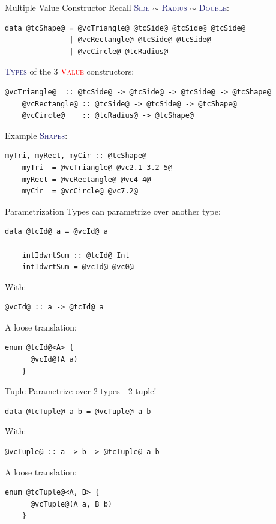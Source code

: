 \documentclass[xcolor={usenames,dvipsnames}]{beamer}
\newcommand{\htycon}[1]{\textcolor{MidnightBlue}{\textsc{#1}}}
\newcommand{\hvalcon}[1]{\textcolor{Red}{\textsc{#1}}}
\begin{document}
\begin{frame}[fragile]{Multiple Value Constructor}
  Recall \htycon{Side} $\sim$ \htycon{Radius} $\sim$ \htycon{Double}:
  \begin{lstlisting}[style=hask]
    data @tcShape@ = @vcTriangle@ @tcSide@ @tcSide@ @tcSide@
               | @vcRectangle@ @tcSide@ @tcSide@
               | @vcCircle@ @tcRadius@
  \end{lstlisting}

  \htycon{Types} of the 3 \hvalcon{Value} constructors:
  \begin{lstlisting}[style=hask]
    @vcTriangle@  :: @tcSide@ -> @tcSide@ -> @tcSide@ -> @tcShape@
    @vcRectangle@ :: @tcSide@ -> @tcSide@ -> @tcShape@
    @vcCircle@    :: @tcRadius@ -> @tcShape@
  \end{lstlisting}

  Example \htycon{Shapes}:
  \begin{lstlisting}[style=hask]
    myTri, myRect, myCir :: @tcShape@
    myTri  = @vcTriangle@ @vc2.1 3.2 5@
    myRect = @vcRectangle@ @vc4 4@
    myCir  = @vcCircle@ @vc7.2@
  \end{lstlisting}
\end{frame}

\begin{frame}[fragile]{Parametrization}
  Types can parametrize over another type:
  \begin{lstlisting}[style=hask]
    data @tcId@ a = @vcId@ a

    intIdwrtSum :: @tcId@ Int
    intIdwrtSum = @vcId@ @vc0@
  \end{lstlisting}

  With:
  \begin{lstlisting}[style=hask]
    @vcId@ :: a -> @tcId@ a
  \end{lstlisting}

  A loose translation:
  \begin{lstlisting}[style=hask]
    enum @tcId@<A> {
      @vcId@(A a)
    }
  \end{lstlisting}
\end{frame}

\begin{frame}[fragile]{Tuple}
  Parametrize over 2 types - 2-tuple!
  \begin{lstlisting}[style=hask]
    data @tcTuple@ a b = @vcTuple@ a b
  \end{lstlisting}

  With:
  \begin{lstlisting}[style=hask]
    @vcTuple@ :: a -> b -> @tcTuple@ a b
  \end{lstlisting}

  A loose translation:
  \begin{lstlisting}[style=hask]
    enum @tcTuple@<A, B> {
      @vcTuple@(A a, B b)
    }
  \end{lstlisting}
\end{frame}
\end{document}
